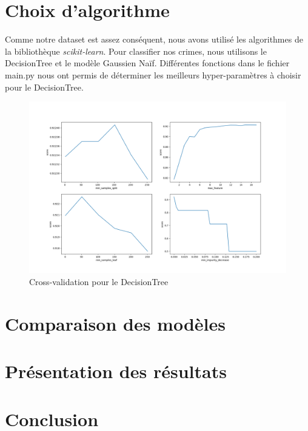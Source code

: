 \documentclass{article}
\begin{document}
    \section{Choix d'algorithme}
    Comme notre dataset est assez conséquent, nous avons utilisé les algorithmes 
    de la bibliothèque \textit{scikit-learn}.
    Pour classifier nos crimes, nous utilisons le DecisionTree et le modèle Gaussien Naïf.
    Différentes fonctions dans le fichier main.py nous ont permis de déterminer les meilleurs
    hyper-paramètres à choisir pour le DecisionTree.
    \begin{figure}[H]
            \centering
	    \includegraphics[scale=.4]{bestParamDecisionTree.png}
	    \caption{Cross-validation pour le DecisionTree}
    \end{figure}

    \section{Comparaison des modèles}

    \section{Présentation des résultats}

    \section{Conclusion}
\end{document}
